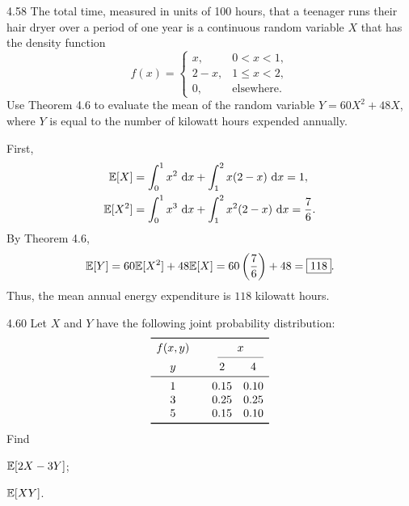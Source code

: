 \documentclass[11pt,oneside]{article}
\begin{document}
\begin{exercise}{4.58}
The total time, measured in units of 100 hours, that a teenager runs their hair dryer over a period of one year is a continuous random variable $X$ that has the density function
\[
    f(x)=
    \begin{cases}
        x, & 0<x<1,\\
        2-x, & 1\leq x<2,\\
        0, & \text{elsewhere}.
    \end{cases}
\]
Use Theorem 4.6 to evaluate the mean of the random variable $Y=60X^2+48X$, where $Y$ is equal to the number of kilowatt hours expended annually.
\end{exercise}

\begin{solution}
First,
\[
\begin{aligned}
    \mathbb{E}[X]
    &=\int_0^1 x^2\,\mathop{}\!\mathrm{d} x+\int_1^2 x(2-x)\,\mathop{}\!\mathrm{d} x=1,\\
    \mathbb{E}[X^2]
    &=\int_0^1 x^3\,\mathop{}\!\mathrm{d} x+\int_1^2 x^2(2-x)\,\mathop{}\!\mathrm{d} x=\frac76.
\end{aligned}
\]
By Theorem 4.6,
\[
    \mathbb{E}[Y]
    =60\mathbb{E}[X^2]+48\mathbb{E}[X]
    =60\left(\frac76\right)+48
    =\boxed{118}.
\]
Thus, the mean annual energy expenditure is $118$ kilowatt hours.
\end{solution}

\begin{exercise}{4.60}
Let $X$ and $Y$ have the following joint probability distribution:
\[
\begin{array}{c@{\qquad}cc}
\toprule
f(x,y) & \multicolumn{2}{c}{x} \\
\cmidrule(lr){2-3}
y & 2 & 4 \\
\midrule
1 & 0.15 & 0.10 \\
3 & 0.25 & 0.25 \\
5 & 0.15 & 0.10 \\
\bottomrule
\end{array}
\]
Find
\begin{exercisesubparts}
    \item $\mathbb{E}[2X-3Y]$;
    \item $\mathbb{E}[XY]$.
\end{exercisesubparts}
\end{exercise}
\end{document}

